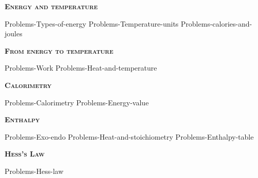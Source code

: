 \documentclass[main.tex]{subfiles}
\newcommand\chapterlabel{Ch-thermochemistry}
\begin{document}
\newpage
\setdoublesep{0.35700 em}  %
\setatomsep{1.78500 em}    %
\setbondoffset{0.18265 em} %
\newcommand{\bondwidth}{0.06642 em} %
\setbondstyle{line width = \bondwidth}
\fancyhfoffset[E,O]{0pt}
\setlength{\columnsep}{30pt}
\begin{conclusion}
\end{conclusion}
\begin{multicols*}{2}\setcounter{numA}{1}




{\raggedright\textsc{\textbf{Energy and temperature }}\par}
{Problems-Types-of-energy}
{Problems-Temperature-units}
{Problems-calories-and-joules}

{\raggedright\textsc{\textbf{From energy to temperature}}\par}
{Problems-Work}%
{Problems-Heat-and-temperature}

{\raggedright\textsc{\textbf{Calorimetry }}\par}
{Problems-Calorimetry}
{Problems-Energy-value}


{\raggedright\textsc{\textbf{Enthalpy }}\par}%
{Problems-Exo-endo}%
{Problems-Heat-and-stoichiometry}%
{Problems-Enthalpy-table}%

{\raggedright\textsc{\textbf{Hess's Law }}\par}%
{Problems-Hess-law}%













\end{multicols*}
\end{document}
